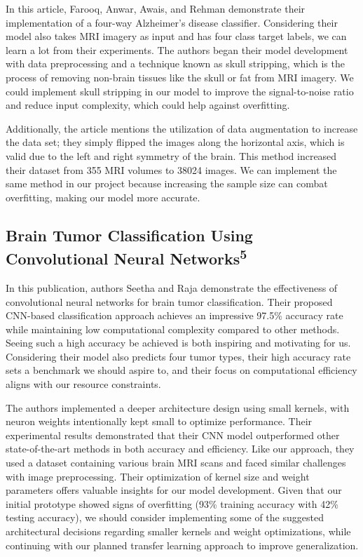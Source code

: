 \documentclass[conference]{IEEEtran}
\begin{document}
In this article, Farooq, Anwar, Awais, and Rehman demonstrate their implementation of a four-way Alzheimer's disease classifier. Considering their model also takes MRI imagery as input and has four class target labels, we can learn a lot from their experiments. The authors began their model development with data preprocessing and a technique known as skull stripping, which is the process of removing non-brain tissues like the skull or fat from MRI imagery. We could implement skull stripping in our model to improve the signal-to-noise ratio and reduce input complexity, which could help against overfitting. 

Additionally, the article mentions the utilization of data augmentation to increase the data set; they simply flipped the images along the horizontal axis, which is valid due to the left and right symmetry of the brain. This method increased their dataset from 355 MRI volumes to 38024 images. We can implement the same method in our project because increasing the sample size can combat overfitting, making our model more accurate.

\subsection{\large Brain Tumor Classification Using Convolutional Neural Networks\textsuperscript{5}}

In this publication, authors Seetha and Raja demonstrate the effectiveness of convolutional neural networks for brain tumor classification. Their proposed CNN-based classification approach achieves an impressive 97.5\% accuracy rate while maintaining low computational complexity compared to other methods. Seeing such a high accuracy be achieved is both inspiring and motivating for us. Considering their model also predicts four tumor types, their high accuracy rate sets a benchmark we should aspire to, and their focus on computational efficiency aligns with our resource constraints. 

The authors implemented a deeper architecture design using small kernels, with neuron weights intentionally kept small to optimize performance. Their experimental results demonstrated that their CNN model outperformed other state-of-the-art methods in both accuracy and efficiency. Like our approach, they used a dataset containing various brain MRI scans and faced similar challenges with image preprocessing. Their optimization of kernel size and weight parameters offers valuable insights for our model development. Given that our initial prototype showed signs of overfitting (93\% training accuracy with 42\% testing accuracy), we should consider implementing some of the suggested architectural decisions regarding smaller kernels and weight optimizations, while continuing with our planned transfer learning approach to improve generalization.
\end{document}

